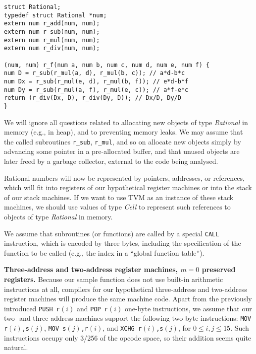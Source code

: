 \documentclass[12pt,oneside]{article}
\def\makepoint#1{\medbreak\noindent{\bf #1.\ }}
\def\nxsubpoint{\refstepcounter{subsubsection}%
    \smallbreak\makepoint{\thesubsubsection}}
\def\emb#1{\textbf{#1.}}
\begin{document}
\begin{verbatim}
struct Rational;
typedef struct Rational *num;
extern num r_add(num, num);
extern num r_sub(num, num);
extern num r_mul(num, num);
extern num r_div(num, num);

(num, num) r_f(num a, num b, num c, num d, num e, num f) {
num D = r_sub(r_mul(a, d), r_mul(b, c)); // a*d-b*c
num Dx = r_sub(r_mul(e, d), r_mul(b, f)); // e*d-b*f
num Dy = r_sub(r_mul(a, f), r_mul(e, c)); // a*f-e*c
return (r_div(Dx, D), r_div(Dy, D)); // Dx/D, Dy/D
}
\end{verbatim}
We will ignore all questions related to allocating new objects of type \textit{Rational\/} in memory (e.g., in heap), and to preventing memory leaks. We may assume that the called subroutines \texttt{r\_sub}, \texttt{r\_mul}, and so on allocate new objects simply by advancing some pointer in a pre-allocated buffer, and that unused objects are later freed by a garbage collector, external to the code being analysed.

Rational numbers will now be represented by pointers, addresses, or references, which will fit into registers of our hypothetical register machines or into the stack of our stack machines. If we want to use TVM as an instance of these stack machines, we should use values of type \textit{Cell} to represent such references to objects of type \textit{Rational} in memory.

We assume that subroutines (or functions) are called by a special \texttt{CALL} instruction, which is encoded by three bytes, including the specification of the function to be called (e.g., the index in a ``global function table'').

\nxsubpoint\label{sp:cmp2.2addr.0}\emb{Three-address and two-address register machines, $m=0$ preserved registers}
Because our sample function does not use built-in arithmetic instructions at all, compilers for our hypothetical three-address and two-address register machines will produce the same machine code. Apart from the previously introduced \texttt{PUSH r$(i)$} and \texttt{POP r$(i)$} one-byte instructions, we assume that our two- and three-address machines support the following two-byte instructions: \texttt{MOV r$(i)$,s$(j)$}, \texttt{MOV s$(j)$,r$(i)$}, and \texttt{XCHG r$(i)$,s$(j)$}, for $0\leq i,j\leq 15$. Such instructions occupy only 3/256 of the opcode space, so their addition seems quite natural.
\end{document}
